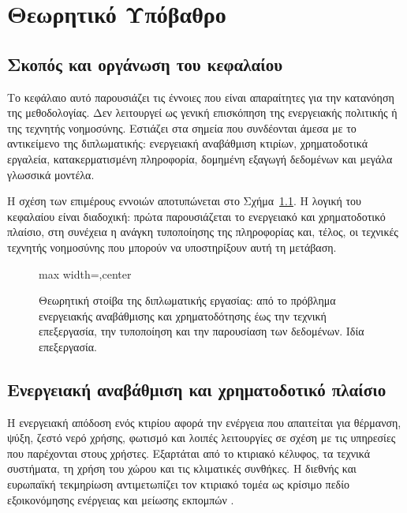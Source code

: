 \chapter{Θεωρητικό Υπόβαθρο}
\label{chap:theoretical-background}

\section{Σκοπός και οργάνωση του κεφαλαίου}

Το κεφάλαιο αυτό παρουσιάζει τις έννοιες που είναι απαραίτητες για την κατανόηση
της μεθοδολογίας. Δεν λειτουργεί ως γενική επισκόπηση της ενεργειακής πολιτικής
ή της τεχνητής νοημοσύνης. Εστιάζει στα σημεία που συνδέονται άμεσα με το
αντικείμενο της διπλωματικής: ενεργειακή αναβάθμιση κτιρίων, χρηματοδοτικά
εργαλεία, κατακερματισμένη πληροφορία, δομημένη εξαγωγή δεδομένων και μεγάλα
γλωσσικά μοντέλα.

Η σχέση των επιμέρους εννοιών αποτυπώνεται στο
Σχήμα~\ref{fig:theoretical-stack}. Η λογική του κεφαλαίου είναι διαδοχική:
πρώτα παρουσιάζεται το ενεργειακό και χρηματοδοτικό πλαίσιο, στη συνέχεια η
ανάγκη τυποποίησης της πληροφορίας και, τέλος, οι τεχνικές τεχνητής νοημοσύνης
που μπορούν να υποστηρίξουν αυτή τη μετάβαση.

\begin{figure}[!htbp]
    \centering
    \begin{adjustbox}{max width=\textwidth,center}
        
    \end{adjustbox}
    \caption[Θεωρητική στοίβα της διπλωματικής εργασίας]{Θεωρητική στοίβα της διπλωματικής εργασίας: από το πρόβλημα ενεργειακής αναβάθμισης και χρηματοδότησης έως την τεχνική επεξεργασία, την τυποποίηση και την παρουσίαση των δεδομένων. Ιδία επεξεργασία.}
    \label{fig:theoretical-stack}
\end{figure}

\section{Ενεργειακή αναβάθμιση και χρηματοδοτικό πλαίσιο}

Η ενεργειακή απόδοση ενός κτιρίου αφορά την ενέργεια που απαιτείται για
θέρμανση, ψύξη, ζεστό νερό χρήσης, φωτισμό και λοιπές λειτουργίες σε σχέση με
τις υπηρεσίες που παρέχονται στους χρήστες. Εξαρτάται από το κτιριακό κέλυφος,
τα τεχνικά συστήματα, τη χρήση του χώρου και τις κλιματικές συνθήκες. Η
διεθνής και ευρωπαϊκή τεκμηρίωση αντιμετωπίζει τον κτιριακό τομέα ως κρίσιμο
πεδίο εξοικονόμησης ενέργειας και μείωσης εκπομπών
\cite{iea_buildings_2026,ipcc_ar6_wg3_buildings,ec_epbd_page_2026,
ec_epbd_news_2025,eea_building_emissions_2025}.

